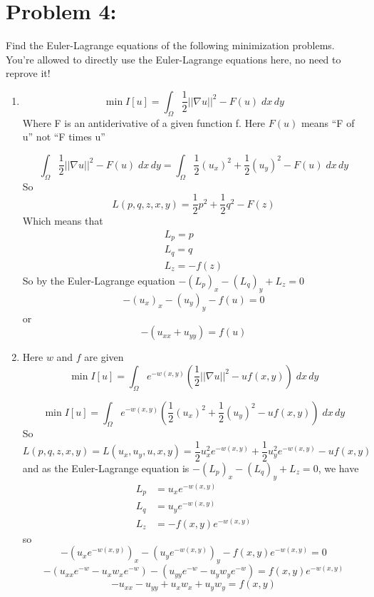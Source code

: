 \documentclass[12pt]{article}
\begin{document}
\pagebreak
\section*{Problem 4:} 
Find the Euler-Lagrange equations of the following minimization problems. You're allowed to directly use the Euler-Lagrange equations here, no need to reprove it!

\begin{enumerate}
    \item \[\min I[u] = \int_{\Omega} \frac{1}{2}||\nabla u||^2 - F(u)\; dx\, dy\]
    Where F is an antiderivative of a given function f. Here $F(u)$ means “F of u” not “F times u”

    \color{blue}
    \[\int_{\Omega} \frac{1}{2}||\nabla u||^2 - F(u)\; dx\, dy = \int_{\Omega} \frac{1}{2}(u_x)^2 + \frac{1}{2}(u_y)^2 - F(u)\; dx\, dy\]
    So 
    \[L(p, q, z, x, y) = \frac{1}{2}p^2 + \frac{1}{2}q^2 - F(z)\]
    Which means that 
    \begin{gather*}
        L_p = p\\
        L_q = q\\
        L_z = -f(z)
    \end{gather*}
    So by the Euler-Lagrange equation $-(L_p)_x - (L_q)_y + L_z = 0$
    \[-(u_x)_x - (u_y)_y -f(u) = 0\]
    or 
    \[\boxed{-(u_{xx} + u_{yy}) = f(u)}\]
    \color{black}
    \pagebreak

    \item Here $w$ and $f$ are given 
    \[\min I[u] = \int_{\Omega}e^{-w(x, y)} \left(\frac{1}{2}||\nabla u||^2 - uf(x, y)\right)\; dx\, dy\]

    \color{blue}
    \[\min I[u] = \int_{\Omega}e^{-w(x, y)} \left(\frac{1}{2}(u_x)^2 + \frac{1}{2}(u_y)^2 - uf(x, y)\right)\; dx\, dy\]
    So 
    \[L(p, q, z, x, y) = L(u_x, u_y, u, x, y) = \frac{1}{2}u_x^2 e^{-w(x, y)} + \frac{1}{2}u_y^2e^{-w(x, y)} - uf(x, y)\]
    and as the Euler-Lagrange equation is $-(L_p)_x -(L_q)_y + L_z = 0$, we have 
    \begin{align*}
        L_p &= u_xe^{-w(x, y)}\\
        L_q &= u_ye^{-w(x, y)}\\
        L_z &= -f(x, y)e^{-w(x, y)}
    \end{align*} 
    so 
    \[-(u_xe^{-w(x, y)})_x - (u_ye^{-w(x, y)})_y- f(x, y)e^{-w(x, y)} = 0\]  
    \[-(u_{xx}e^{-w} - u_xw_xe^{-w}) - (u_{yy}e^{-w} - u_yw_y e^{-w}) = f(x, y)e^{-w(x, y)}\]
    \[\boxed{-u_{xx} - u_{yy} + u_xw_x + u_y w_y = f(x, y)}\]
    \color{black}
\end{enumerate}
\end{document}
